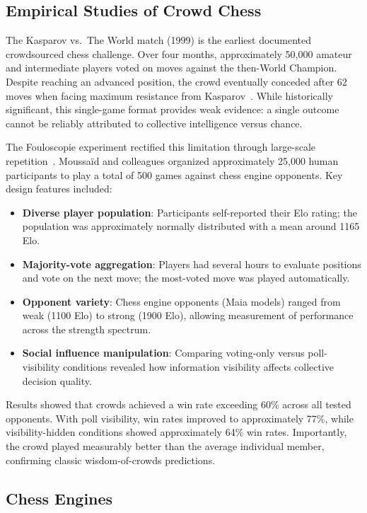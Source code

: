 \documentclass[format=acmsmall, review=false]{acmart}
\begin{document}
\subsection{Empirical Studies of Crowd Chess}

The Kasparov vs.\ The World match (1999) is the earliest documented crowdsourced chess challenge.
Over four months, approximately 50,000 amateur and intermediate players voted on moves against the then-World Champion.
Despite reaching an advanced position, the crowd eventually conceded after 62 moves when facing maximum resistance from Kasparov~\cite{kasparov1999}.
While historically significant, this single-game format provides weak evidence: a single outcome cannot be reliably attributed to collective intelligence versus chance.

The Fouloscopie experiment rectified this limitation through large-scale repetition~\cite{moussaid2025}.
Moussaïd and colleagues organized approximately 25,000 human participants to play a total of 500 games against chess engine opponents.
Key design features included:
\begin{itemize}
  \item \textbf{Diverse player population}: Participants self-reported their Elo rating; the population was approximately normally distributed with a mean around 1165 Elo.
  \item \textbf{Majority-vote aggregation}: Players had several hours to evaluate positions and vote on the next move; the most-voted move was played automatically.
  \item \textbf{Opponent variety}: Chess engine opponents (Maia models) ranged from weak (1100 Elo) to strong (1900 Elo), allowing measurement of performance across the strength spectrum.
  \item \textbf{Social influence manipulation}: Comparing voting-only versus poll-visibility conditions revealed how information visibility affects collective decision quality.
\end{itemize}
Results showed that crowds achieved a win rate exceeding 60\% across all tested opponents.
With poll visibility, win rates improved to approximately 77\%, while visibility-hidden conditions showed approximately 64\% win rates.
Importantly, the crowd played measurably better than the average individual member, confirming classic wisdom-of-crowds predictions.

\subsection{Chess Engines}
\end{document}
